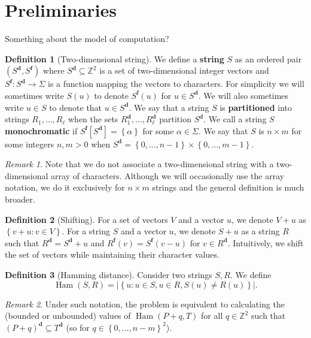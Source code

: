 \documentclass[11pt]{article}
\newcommand{\Z}{\mathbb{Z}}
\newcommand{\set}[1]{\left\lbrace #1 \right\rbrace}
\DeclareMathOperator*{\Ham}{Ham}
\theoremstyle{plain}
\theoremstyle{definition}
\newtheorem{definition}{Definition}
\theoremstyle{remark}
\newtheorem*{remark}{Remark}
\begin{document}
\section{Preliminaries}

Something about the model of computation?

\renewcommand{\d}[1]{#1^\mathbf{d}}
\newcommand{\f}[1]{#1^\mathbf{f}}
\begin{definition}[Two-dimensional string]
	We define a \textbf{string} $S$ as an ordered pair $(\d{S}, \f{S})$ where $\d{S} \subseteq \Z^2$ is a set of two-dimensional integer vectors and $\f{S} : \d{S} \to \Sigma$
	is a function mapping the vectors to characters.
	For simplicity we will sometimes write $S(u)$ to denote $\f{S}(u)$ for $u \in \d{S}$.
	We will also sometimes write $u \in S$ to denote that $u \in \d{S}$.
	We say that a string $S$ is \textbf{partitioned} into strings $R_1, \dots, R_\ell$ when the sets $\d{R_1}, \dots, \d{R_\ell}$ partition $\d{S}$.
	We call a string $S$ \textbf{monochromatic} if $\f{S}[\d{S}] = \set{\alpha}$ for some $\alpha \in \Sigma$.
	We say that $S$ is $n \times m$ for some integers $n, m > 0$ when $\d{S} = \set{0, \dots, n - 1} \times \set{0, \dots, m - 1}$.
\end{definition}


\begin{remark}
	Note that we do not associate a two-dimensional string with a two-dimensional array of characters.
	Although we will occasionally use the array notation, we do it exclusively for $n \times m$ strings and the general definition is much broader.
\end{remark}


\begin{definition}[Shifting]
	For a set of vectors $V$ and a vector $u$, we denote $V + u$ as $\set{v + u : v \in V}$.
	For a string $S$ and a vector $u$, we denote $S + u$ as a string $R$ such that
	$\d{R} = \d{S} + u$ and $\f{R}(v) = \f{S}(v - u)$ for $v \in \d{R}$.
	Intuitively, we shift the set of vectors while maintaining their character values.
\end{definition}


\begin{definition}[Hamming distance]
	Consider two strings $S, R$. We define
	$$ \Ham(S, R) = |\set{u : u \in S, u \in R, S(u) \neq R(u)}|.$$
\end{definition}


\begin{remark}
	Under such notation, the \HD problem is equivalent to calculating the (bounded or unbounded) values of $ \Ham(P + q, T) $
	for all $q \in \Z^2$ such that $\d{(P + q)} \subseteq \d{T}$ (so for $q \in \set{0, \dots, n - m}^2$).
\end{remark}
\end{document}

